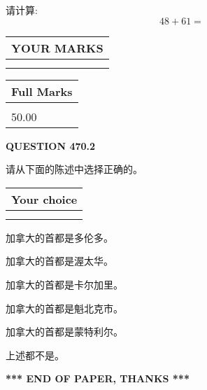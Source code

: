 \documentclass{ctexart}
\begin{document}
  
 
请计算:
\begin{equation}
48 +  %
61 = \nonumber
\end{equation}
 

 

 
  
\vspace{0.2in}
  
\noindent\begin{tabular}{|l|}
\hline
 YOUR MARKS  \\
\hline
 \\ 
 \\ 
\hline
\end{tabular}
\hspace{0.05in} \begin{tabular}{|l|}
\hline
 Full Marks  \\
\hline
 \\ 
50.00 \\
\hline
\end{tabular}
{\textbf{\Large{QUESTION
470.2 
}}}
  
  
请从下面的陈述中选择正确的。
  
  
\noindent\hspace{3.0in} \begin{tabular}{|l|}
\hline
Your choice \\
\hline
 \\ 
 \\ 
\hline
\end{tabular}
  
  
 
 
加拿大的首都是多伦多。
 
 
加拿大的首都是渥太华。
 
 
加拿大的首都是卡尔加里。
 
 
加拿大的首都是魁北克市。
 
 
加拿大的首都是蒙特利尔。
 
 
 上述都不是。
 
 
   
   
 \vspace{0.2in}
 
   
   
   
   
\vspace{1.0in} 
{\textbf{\large{ *** END OF PAPER, THANKS *** }}} 
   
\end{document}
